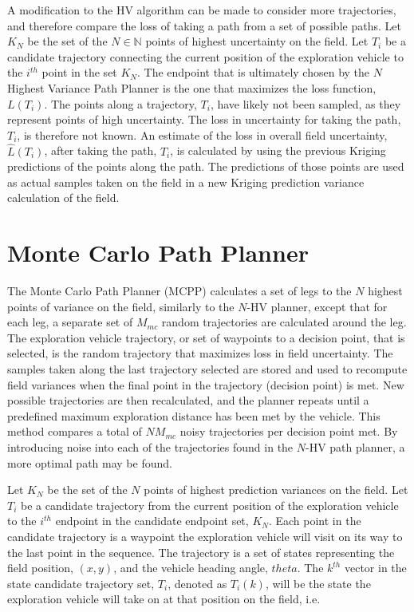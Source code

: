 A modification to the HV algorithm can be made to consider more trajectories, and therefore compare the loss of taking a path from a set of possible paths. Let $K_N$ be the set of the $N \in \mathbb{N}$ points of highest uncertainty on the field. Let $T_i$ be a candidate trajectory connecting the current position of the exploration vehicle to the $i^{th}$ point in the set $K_N$. The endpoint that is ultimately chosen by the $N$ Highest Variance Path Planner is the one that maximizes the loss function, $L(T_i)$. The points along a trajectory, $T_i$, have likely not been sampled, as they represent points of high uncertainty. The loss in uncertainty for taking the path, $T_i$, is therefore not known. An estimate of the loss in overall field uncertainty, $\hat{L}(T_i)$, after taking the path, $T_i$, is calculated by using the previous Kriging predictions of the points along the path. The predictions of those points are used as actual samples taken on the field in a new Kriging prediction variance calculation of the field.

\section{Monte Carlo Path Planner} \label{sec:mcpp}
The Monte Carlo Path Planner (MCPP) calculates a set of legs to the $N$ highest points of variance on the field, similarly to the $N$-HV planner, except that for each leg, a separate set of $M_{mc}$ random trajectories are calculated around the leg. The exploration vehicle trajectory, or set of waypoints to a decision point, that is selected, is the random trajectory that maximizes loss in field uncertainty. The samples taken along the last trajectory selected are stored and used to recompute field variances when the final point in the trajectory (decision point) is met. New possible trajectories are then recalculated, and the planner repeats until a predefined maximum exploration distance has been met by the vehicle. This method compares a total of $N M_{mc}$ noisy trajectories per decision point met. By introducing noise into each of the trajectories found in the $N$-HV path planner, a more optimal path may be found.

Let $K_N$ be the set of the $N$ points of highest prediction variances on the field. Let $T_i$ be a candidate trajectory from the current position of the exploration vehicle to the $i^{th}$ endpoint in the candidate endpoint set, $K_N$. Each point in the candidate trajectory is a waypoint the exploration vehicle will visit on its way to the last point in the sequence. The trajectory is a set of states representing the field position, $(x,y)$, and the vehicle heading angle, $theta$. The $k^{th}$ vector in the state candidate trajectory set, $T_i$, denoted as $T_{i}(k)$, will be the state the exploration vehicle will take on at that position on the field, i.e.

